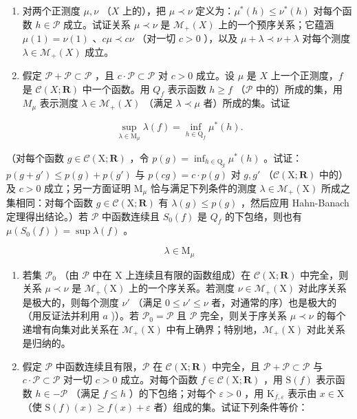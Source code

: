 \begin{enumerate}
\def\labelenumi{\alph{enumi})}
\item
  对两个正测度 \(\mu, \nu\) （\(X\) 上的），把 \(\mu \prec \nu\) 定义为：\(\mu^{*}(h) \leqslant \nu^{*}(h)\) 对每个函数 \(h \in \mathcal{P}\) 成立。试证关系 \(\mu \prec \nu\) 是 \(\mathcal{M}_{+}(X)\) 上的一个预序关系；它蕴涵 \(\mu(1) = \nu(1)\) 、\(c\mu \prec c\nu\) （对一切 \(c > 0\) ），以及 \(\mu + \lambda \prec \nu + \lambda\) 对每个测度 \(\lambda \in \mathcal{M}_{+}(X)\) 成立。
\item
  假定 \(\mathcal{P} + \mathcal{P} \subset \mathcal{P}\) ，且 \(c \cdot \mathcal{P} \subset \mathcal{P}\) 对 \(c > 0\) 成立。设 \(\mu\) 是 \(X\) 上一个正测度，\(f\) 是 \(\mathcal{C}(X; \mathbf{R})\) 中一个函数。用 \(Q_f\) 表示函数 \(h \geqslant f\) （\(\mathcal{P}\) 中的）所成的集，用 \(M_\mu\) 表示测度 \(\lambda \in \mathcal{M}_+(X)\) （满足 \(\lambda \prec \mu\) 者）所成的集。试证
\end{enumerate}

\[
\sup _ {\lambda \in \mathrm{M} _ {\mu}} \lambda (f) = \inf _ {h \in \mathrm{Q} _ {f}} \mu^ {*} (h).
\]

（对每个函数 \(g \in \mathcal{C}(\mathrm{X};\mathbf{R})\) ，令 \(p(g) = \inf_{h \in \mathrm{Q}_g} \mu^*(h)\) 。试证：\(p(g + g') \leqslant p(g) + p(g')\) 与 \(p(cg) = c \cdot p(g)\) 对 \(g, g'\) （\(\mathcal{C}(\mathrm{X};\mathbf{R})\) 中的）及 \(c > 0\) 成立；另一方面证明 \(\mathrm{M}_{\mu}\) 恰与满足下列条件的测度 \(\lambda \in \mathcal{M}_{+}(\mathrm{X})\) 所成之集相同：对每个函数 \(g \in \mathcal{C}(\mathrm{X};\mathbf{R})\) 有 \(\lambda(g) \leqslant p(g)\) ，然后应用 Hahn-Banach 定理得出结论。）若 \(\mathcal{P}\) 中函数连续且 \(S_0(f)\) 是 \(Q_f\) 的下包络，则也有 \(\mu(S_0(f)) = \sup \lambda(f)\) 。

\[
\lambda \in \mathrm{M} _ {\mu}
\]

\begin{enumerate}
\def\labelenumi{\alph{enumi})}
\setcounter{enumi}{2}
\item
  若集 \(\mathcal{P}_0\) （由 \(\mathcal{P}\) 中在 X 上连续且有限的函数组成）在 \(\mathcal{C}(\mathrm{X};\mathbf{R})\) 中完全，则关系 \(\mu \prec \nu\) 是 \(\mathcal{M}_{+}(\mathrm{X})\) 上的一个序关系。若测度 \(\nu \in \mathcal{M}_{+}(\mathrm{X})\) 对此序关系是极大的，则每个测度 \(\nu'\) （满足 \(0 \leqslant \nu' \leqslant \nu\) 者，对通常的序）也是极大的（用反证法并利用 \(a\) )）。若 \(\mathcal{P}_0 = \mathcal{P}\) 且 \(\mathcal{P}\) 完全，则关于序关系 \(\mu \prec \nu\) 的每个递增有向集对此关系在 \(\mathcal{M}_{+}(\mathrm{X})\) 中有上确界；特别地，\(\mathcal{M}_{+}(\mathrm{X})\) 对此关系是归纳的。
\item
  假定 \(\mathcal{P}\) 中函数连续且有限，\(\mathcal{P}\) 在 \(\mathcal{C}(\mathrm{X};\mathbf{R})\) 中完全，且 \(\mathcal{P} + \mathcal{P} \subset \mathcal{P}\) 与 \(c \cdot \mathcal{P} \subset \mathcal{P}\) 对一切 \(c > 0\) 成立。对每个函数 \(f \in \mathcal{C}(\mathrm{X};\mathbf{R})\) ，用 \(\mathrm{S}(f)\) 表示函数 \(h \in -\mathcal{P}\) （满足 \(f \leqslant h\) ）的下包络；对每个 \(\varepsilon > 0\) ，用 \(\mathrm{K}_{f,\varepsilon}\) 表示由 \(x \in \mathrm{X}\) （使 \(\mathrm{S}(f)(x) \geqslant f(x) + \varepsilon\) 者）组成的集。试证下列条件等价：
\end{enumerate}

